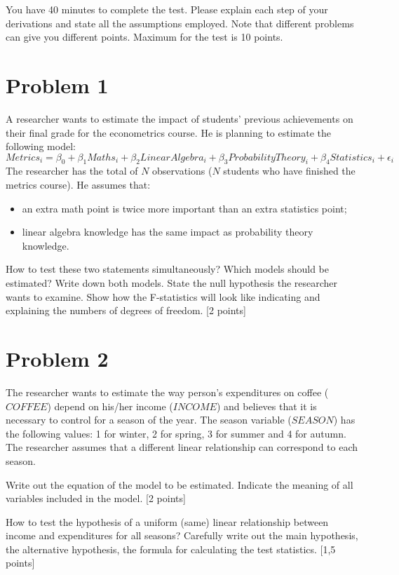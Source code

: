 \documentclass[12pt,letterpaper]{article}
\begin{document}
You have 40 minutes to complete the test. Please explain each step of your derivations and state all the assumptions employed. Note that different problems can give you different points. Maximum for the test is 10 points.  

\bigskip
\section*{Problem 1} 
A researcher wants to estimate the impact of students' previous achievements on their final grade for the econometrics course. He is planning to estimate the following model:
\begin{equation*}
    Metrics_i = \beta_0 + \beta_1 Maths_i + \beta_2 LinearAlgebra_i + \beta_3 ProbabilityTheory_i + \beta_4 Statistics_i + \epsilon_i
\end{equation*}
The researcher has the total of $N$ observations ($N$ students who have finished the metrics course). He assumes that:
\begin{itemize}
    \item an extra math point is twice more important than an extra statistics point;
    \item linear algebra knowledge has the same impact as probability theory knowledge.
\end{itemize}

How to test these two statements simultaneously? Which models should be estimated? Write down both models. State the null hypothesis the researcher wants to examine. Show how the F-statistics will look like indicating and explaining the numbers of degrees of freedom. [2 points]

\medskip
\section*{Problem 2}
The researcher wants to estimate the way person's expenditures on coffee ($COFFEE$) depend on his/her income ($INCOME$) and believes that it is necessary to control for a season of the year. The season variable ($SEASON$) has the following values: 1 for winter, 2 for spring, 3 for summer and 4 for autumn. The researcher assumes that a different linear relationship can correspond to each season.

Write out the equation of the model to be estimated. Indicate the meaning of all variables included in the model. [2 points]

How to test the hypothesis of a uniform (same) linear relationship between income and expenditures for all seasons? Carefully write out the main hypothesis, the alternative hypothesis, the formula for calculating the test statistics. [1,5 points]
\end{document}
